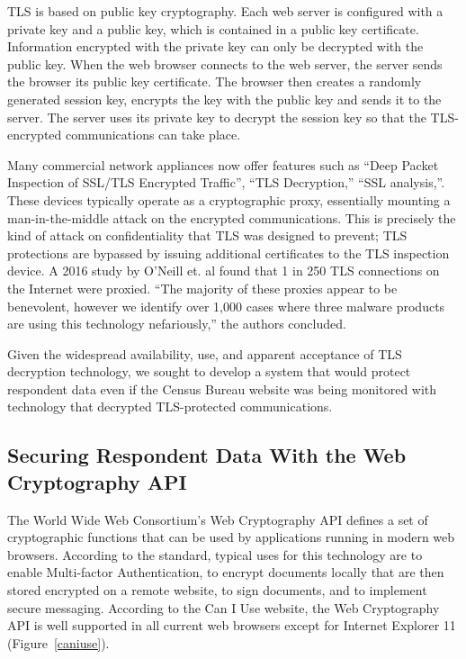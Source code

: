 \documentclass[fleqn,10pt]{wlscirep}
\begin{document}
TLS is based on public key cryptography. Each web server is configured
with a private key and a public key, which is contained in a public
key certificate. Information encrypted with the private key can only
be decrypted with the public key. When the web browser connects to the
web server, the server sends the browser its public key
certificate. The browser then creates a randomly generated session
key, encrypts the key with the public key and sends it to the
server. The server uses its private key to decrypt the session key so
that the TLS-encrypted communications can take place.

Many commercial network appliances now offer features such as ``Deep
Packet Inspection of SSL/TLS Encrypted
Traffic''\cite{sonicwall}, ``TLS Decryption,''\cite{paloalto} ``SSL
analysis,''\cite{globalsign}. These devices typically operate as a
cryptographic proxy, essentially mounting a man-in-the-middle attack
on the encrypted communications. This is precisely the kind of attack
on confidentiality that TLS was designed to prevent; TLS protections
are bypassed by issuing additional certificates to the TLS inspection
device. A 2016 study by O'Neill et. al found that 1 in 250 TLS
connections on the Internet were proxied. ``The majority of these proxies appear to be benevolent,
however we identify over 1,000 cases where three malware
products are using this technology nefariously,'' the authors concluded.\cite{DBLP:conf/imc/ONeillRSZ16}

Given the widespread availability, use, and apparent acceptance of TLS
decryption technology, we sought to develop a system that would
protect respondent data even if the Census Bureau website was being
monitored with technology that decrypted TLS-protected communications. 
 
\subsection{Securing Respondent Data With the Web Cryptography API}

The World Wide Web Consortium's Web Cryptography API\cite{wcapi}
defines a set of cryptographic functions that can be used by
applications running in modern web browsers. According to the
standard, typical uses for this technology are to enable Multi-factor
Authentication, to encrypt documents locally that are then stored
encrypted on a remote website, to sign documents, and to implement
secure messaging. According to the Can I Use website, the Web
Cryptography API is well supported in all current web browsers except
for Internet Explorer 11 (Figure~\ref{caniuse}).
\end{document}
